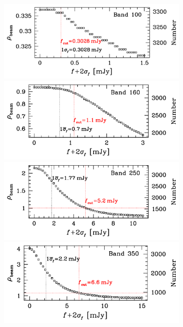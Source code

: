 \documentclass[11pt,a4paper]{article}
\begin{document}
\begin{figure}[H]
	\includegraphics[width=0.85\textwidth]{plot_cutting_flux_100} 
	\includegraphics[width=0.85\textwidth]{plot_cutting_flux_160} 
	\includegraphics[width=0.85\textwidth]{plot_cutting_flux_250} 
	\includegraphics[width=0.85\textwidth]{plot_cutting_flux_350} 
\end{figure}
\end{document}
